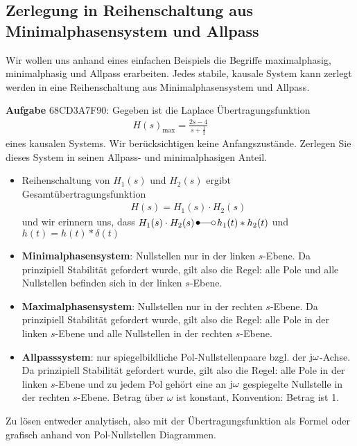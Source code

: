 \subsection{Zerlegung in Reihenschaltung aus Minimalphasensystem und Allpass}
\label{sec:68CD3A7F90}
\begin{Ziel}
Wir wollen uns anhand eines
einfachen Beispiels die Begriffe maximalphasig, minimalphasig und Allpass erarbeiten.
Jedes stabile, kausale System kann zerlegt werden in eine Reihenschaltung aus
Minimalphasensystem und Allpass.
\end{Ziel}
\textbf{Aufgabe} {\tiny 68CD3A7F90}: Gegeben ist die Laplace
Übertragungsfunktion
\begin{align}
H(s)_\mathrm{max} = \frac{2 s-4}{s+\frac{1}{2}}\qquad
\end{align}
eines kausalen Systems. Wir berücksichtigen keine Anfangszustände.
Zerlegen Sie dieses System in seinen Allpass- und minimalphasigen Anteil.





\begin{Werkzeug}
\begin{itemize}
  \item Reihenschaltung von $H_1(s)$ und $H_2(s)$ ergibt Gesamtübertragungsfunktion
  \begin{align}
    H(s) = H_1(s) \cdot H_2(s)
  \end{align}
  und wir erinnern uns, dass $H_1(s)\cdot H_2(s) \,\Laplace\, h_1(t)\ast h_2(t)$
  und $h(t) = h(t)\ast \delta(t)$
  \item \textbf{Minimalphasensystem}: Nullstellen nur in der linken $s$-Ebene. Da prinzipiell
  Stabilität gefordert wurde, gilt also die Regel: alle Pole und alle Nullstellen
  befinden sich in der linken $s$-Ebene.
  \item \textbf{Maximalphasensystem}: Nullstellen nur in der rechten $s$-Ebene. Da prinzipiell
  Stabilität gefordert wurde, gilt also die Regel: alle Pole in der linken
  $s$-Ebene und alle Nullstellen in der rechten $s$-Ebene.
  \item \textbf{Allpasssystem}: nur spiegelbildliche Pol-Nullstellenpaare bzgl.
  der $\im\omega$-Achse. Da prinzipiell Stabilität gefordert wurde, gilt also
  die Regel: alle Pole in der linken $s$-Ebene und zu jedem Pol gehört
  eine an $\im\omega$ gespiegelte Nullstelle in der rechten $s$-Ebene.
  Betrag über $\omega$ ist konstant, Konvention: Betrag ist 1.
\end{itemize}


\end{Werkzeug}
\begin{Ansatz}
Zu lösen entweder analytisch, also mit der Übertragungsfunktion als Formel
oder grafisch anhand von Pol-Nullstellen Diagrammen.
\end{Ansatz}

